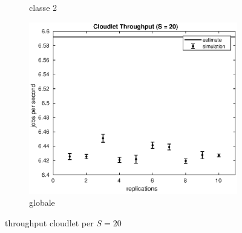 \begin{figure}[!h]
\begin{subfigure}[t]{0.49\textwidth}
\caption{classe 2}
\label{20_x2clet}
\end{subfigure}
%
\begin{subfigure}[t]{0.5\textwidth}
\includegraphics[width=\textwidth]{figures/simul/20_500K_xclet}
\caption{globale}
\label{20_xclet}
\end{subfigure}
%
\caption{throughput cloudlet per $S = 20$}
\end{figure}
%

